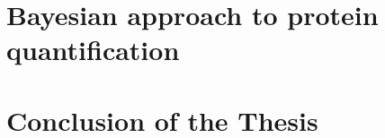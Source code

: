 \documentclass[11pt, a4paper]{report}
\begin{document}
\chapter{Bayesian approach to protein quantification}
\label{chap:model}


\chapter{Conclusion of the Thesis}
\label{chap:conclusion}



\footnotesize{}
\end{document}
